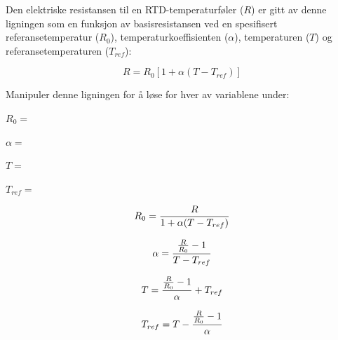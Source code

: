 

Den elektriske resistansen til en RTD-temperaturføler ($R$) er gitt av denne ligningen som en funksjon av basisresistansen ved en spesifisert referansetemperatur ($R_0$), temperaturkoeffisienten ($\alpha$), temperaturen ($T$) og referansetemperaturen ($T_{ref}$):

$$R = R_0 [1 + \alpha(T - T_{ref})]$$

Manipuler denne ligningen for å løse for hver av variablene under:

\vskip 10pt

$R_0 =$

\vskip 10pt

$\alpha =$

\vskip 10pt

$T =$

\vskip 10pt

$T_{ref} =$

\vskip 10pt







$$R_0 = {R \over {1 + \alpha(T - T_{ref})}}$$

\vskip 20pt

$$\alpha = {{{R \over R_0} - 1} \over {T - T_{ref}}}$$

\vskip 20pt

$$T = {{{R \over R_0} - 1} \over \alpha} + T_{ref}$$

\vskip 20pt

$$T_{ref} = T - {{{R \over R_0} - 1} \over \alpha}$$










